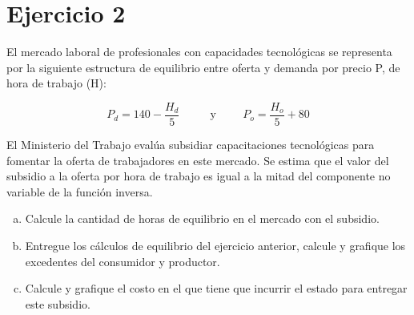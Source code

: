 \documentclass[11pt,letterpaper]{article}
\begin{document}
\section*{Ejercicio 2}
\noindent El mercado laboral de profesionales con capacidades tecnológicas se representa por la siguiente estructura de equilibrio entre oferta y demanda por precio P, de hora de trabajo (H):


$$P_d = 140 - \frac{H_d}{5}  \hspace{1cm} \text{ y}   \hspace{1cm}   P_o = \frac{H_o}{5}+80$$

\noindent El Ministerio del Trabajo evalúa subsidiar capacitaciones tecnológicas para fomentar la oferta de trabajadores en este mercado. Se estima que el valor del subsidio a la oferta por hora de trabajo es igual a la mitad del componente no variable de la función inversa.
\begin{enumerate}[a)]

\item Calcule la cantidad de horas de equilibrio en el mercado con el subsidio.


\item  Entregue los cálculos de equilibrio del ejercicio anterior, calcule y grafique los excedentes del consumidor y productor.


\item Calcule y grafique el costo en el que tiene que incurrir el estado para entregar este subsidio.


\end{enumerate}
\end{document}
